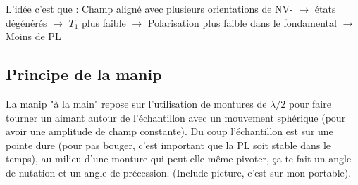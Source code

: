 \documentclass[a4paper]{report}
\begin{document}
  L'idée c'est que : Champ aligné avec plusieurs orientations de NV- $\to$ états dégénérés $\to$ $T_1$ plus faible $\to$ Polarisation plus faible dans le fondamental $\to$ Moins de PL
  
  \subsection{Principe de la manip}
  La manip "à la main" repose sur l'utilisation de montures de $\lambda/2$ pour faire tourner un aimant autour de l'échantillon avec un mouvement sphérique (pour avoir une amplitude de champ constante). Du coup l'échantillon est sur une pointe dure (pour pas bouger, c'est important que la PL soit stable dans le temps), au milieu d'une monture qui peut elle même pivoter, ça te fait un angle de nutation et un angle de précession.
  (Include picture, c'est sur mon portable).
  
\end{document}
